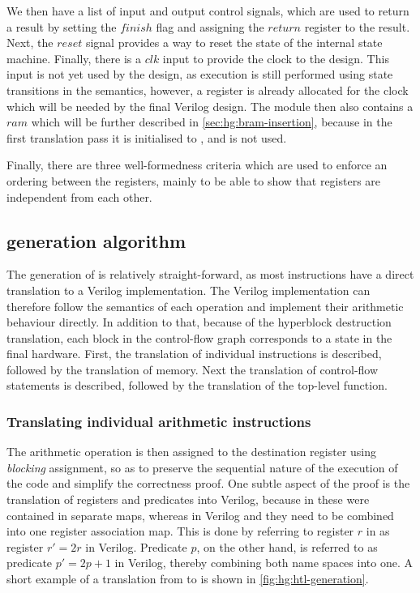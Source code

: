 We then have a list of input and output control signals, which are used to
return a result by setting the $\mathit{finish}$ flag and assigning the
$\mathit{return}$ register to the result.  Next, the $\mathit{reset}$ signal
provides a way to reset the state of the internal state machine.  Finally, there
is a $\mathit{clk}$ input to provide the clock to the design.  This input is not
yet used by the \htl{} design, as execution is still performed using state
transitions in the semantics, however, a register is already allocated for the
clock which will be needed by the final Verilog design.  The module then also
contains a $\mathit{ram}$ which will be further described in
\cref{sec:hg:bram-insertion}, because in the first translation pass it is
initialised to \cnone, and is not used.

Finally, there are three well-formedness criteria which are used to enforce an
ordering between the registers, mainly to be able to show that registers are
independent from each other.

\subsection{\htl{} generation algorithm}%
\label{sec:hg:htl-generation-algorithm}

The generation of \htl{} is relatively straight-forward, as most instructions
have a direct translation to a Verilog implementation.  The Verilog
implementation can therefore follow the semantics of each operation and
implement their arithmetic behaviour directly.  In addition to that, because of
the hyperblock destruction translation, each block in the control-flow graph
corresponds to a state in the final hardware.  First, the translation of
individual instructions is described, followed by the translation of memory.
Next the translation of control-flow statements is described, followed by the
translation of the top-level function.

\subsubsection{Translating individual arithmetic instructions}%
\label{sec:hg:translating-individual-arithmetic-instructions}

The arithmetic operation is then assigned to the destination register using
\emph{blocking} assignment, so as to preserve the sequential nature of the
execution of the code and simplify the correctness proof.  One subtle aspect of
the proof is the translation of registers and predicates into Verilog, because
in \rtlsubpar{} these were contained in separate maps, whereas in Verilog and
\htl{} they need to be combined into one register association map.  This is done
by referring to register $r$ in \rtlsubpar{} as register $r' = 2r$ in Verilog.
Predicate $p$, on the other hand, is referred to as predicate $p' = 2p + 1$ in
Verilog, thereby combining both name spaces into one.  A short example of a
translation from \rtlsubpar{} to \htl{} is shown in
\cref{fig:hg:htl-generation}.

